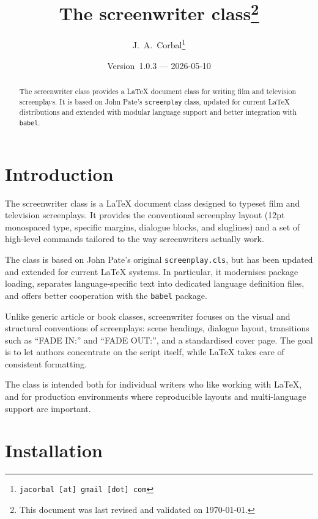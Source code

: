 \documentclass[a4paper]{article}
\title{The \textsf{screenwriter} class\thanks{This document was last
    revised and validated on \today.}}
\author{J.~A.~Corbal\thanks{\texttt{jacorbal [at] gmail [dot] com}}}
\date{Version~1.0.3 --- 2026-05-10}
\begin{document}

\maketitle

\begin{abstract}

    The \textsf{screenwriter} class provides a LaTeX document class for
    writing film and television screenplays.  It is based on John Pate's
    \texttt{screenplay} class, updated for current LaTeX distributions
    and extended with modular language support and better integration
    with \texttt{babel}.

\end{abstract}

\section{Introduction}%

The \textsf{screenwriter} class is a \LaTeX{} document class designed to
typeset film and television screenplays.  It provides the conventional
screenplay layout (12\nobreak\thinspace pt monospaced type, specific
margins, dialogue blocks, and sluglines) and a set of high-level
commands tailored to the way screenwriters actually work.

The class is based on John Pate's original \texttt{screenplay.cls}, but
has been updated and extended for current \LaTeX{} systems.  In
particular, it modernises package loading, separates language-specific
text into dedicated language definition files, and offers better
cooperation with the \texttt{babel} package.

Unlike generic article or book classes, \textsf{screenwriter} focuses on
the visual and structural conventions of screenplays: scene headings,
dialogue layout, transitions such as ``FADE IN:'' and ``FADE OUT:'', and
a standardised cover page.  The goal is to let authors concentrate on
the script itself, while \LaTeX{} takes care of consistent formatting.

The class is intended both for individual writers who like working with
\LaTeX, and for production environments where reproducible layouts and
multi-language support are important.


\section{Installation}%
\end{document}
